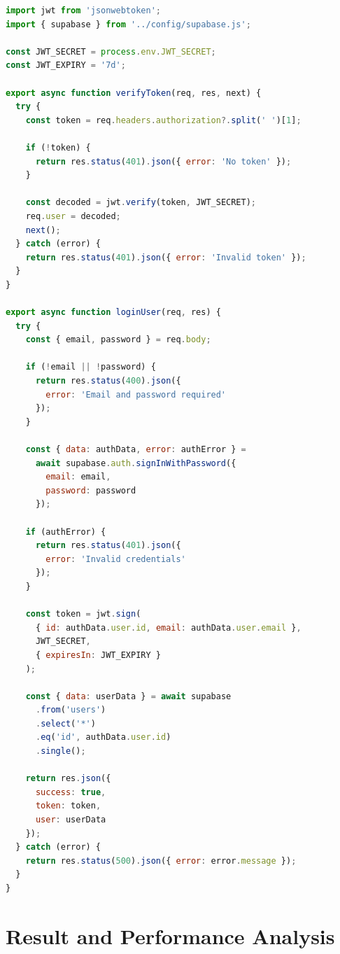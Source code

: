 \documentclass[12pt,a4paper,oneside]{report}
\begin{document}
\begin{lstlisting}[language=JavaScript, caption=Authentication Middleware and User Management, label=lst:auth]
import jwt from 'jsonwebtoken';
import { supabase } from '../config/supabase.js';

const JWT_SECRET = process.env.JWT_SECRET;
const JWT_EXPIRY = '7d';

export async function verifyToken(req, res, next) {
  try {
    const token = req.headers.authorization?.split(' ')[1];

    if (!token) {
      return res.status(401).json({ error: 'No token' });
    }

    const decoded = jwt.verify(token, JWT_SECRET);
    req.user = decoded;
    next();
  } catch (error) {
    return res.status(401).json({ error: 'Invalid token' });
  }
}

export async function loginUser(req, res) {
  try {
    const { email, password } = req.body;

    if (!email || !password) {
      return res.status(400).json({ 
        error: 'Email and password required' 
      });
    }

    const { data: authData, error: authError } = 
      await supabase.auth.signInWithPassword({
        email: email,
        password: password
      });

    if (authError) {
      return res.status(401).json({ 
        error: 'Invalid credentials' 
      });
    }

    const token = jwt.sign(
      { id: authData.user.id, email: authData.user.email },
      JWT_SECRET,
      { expiresIn: JWT_EXPIRY }
    );

    const { data: userData } = await supabase
      .from('users')
      .select('*')
      .eq('id', authData.user.id)
      .single();

    return res.json({
      success: true,
      token: token,
      user: userData
    });
  } catch (error) {
    return res.status(500).json({ error: error.message });
  }
}
\end{lstlisting}

\chapter{Result and Performance Analysis}
\end{document}
